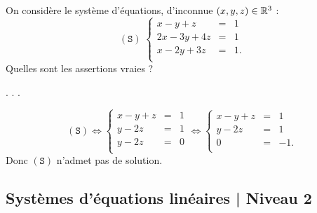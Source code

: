 \begin{question}
On considère le système d'équations, d'inconnue $(x,y,z)\in \mathbb{R}^3$ :  
$$(\mathtt{S}) \; \left\{\begin{array}{rcc}
x-y+z&=&1\\
2x-3y+4z&=&1\\ 
x-2y+3z&=&1.\\
\end{array}\right.$$
Quelles sont les assertions vraies ?
\begin{answers}  
.
.
.
\end{answers}
\begin{explanations} 
$$(\mathtt{S}) \Leftrightarrow  \left\{\begin{array}{rcc}
x-y+z&=&1\\
y-2z&=&1\\ 
y-2z&=&0\\
\end{array}\right.  \Leftrightarrow  \left\{\begin{array}{rcc}
x-y+z&=&1\\
y-2z&=&1\\ 
0&=&-1.\\
\end{array}\right.$$
Donc $(\mathtt{S})$ n'admet pas de solution.
\end{explanations}
\end{question}

\subsection{Systèmes d'équations linéaires | Niveau 2}

